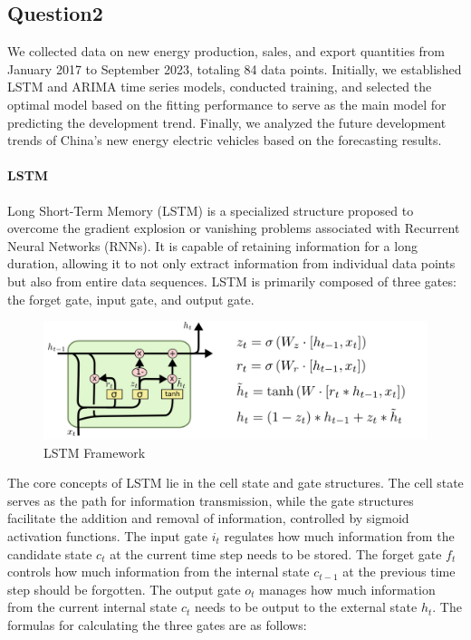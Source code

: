 \documentclass{apmcmthesis}
\begin{document}
\subsection{Question2}
We collected data on new energy production, sales, and export quantities from January 2017 to September 2023, totaling 84 data points. Initially, we established LSTM and ARIMA time series models, conducted training, and selected the optimal model based on the fitting performance to serve as the main model for predicting the development trend. Finally, we analyzed the future development trends of China's new energy electric vehicles based on the forecasting results.

\paragraph{LSTM}
Long Short-Term Memory (LSTM) is a specialized structure proposed to overcome the gradient explosion or vanishing problems associated with Recurrent Neural Networks (RNNs). It is capable of retaining information for a long duration, allowing it to not only extract information from individual data points but also from entire data sequences. LSTM is primarily composed of three gates: the forget gate, input gate, and output gate.\cite{LSTM}

\begin{figure}[h]
    \centering
    \includegraphics[scale=0.6]{figures/Figure/LSTM Framework.png}
    \caption{LSTM Framework}
\end{figure}

The core concepts of LSTM lie in the cell state and gate structures. The cell state serves as the path for information transmission, while the gate structures facilitate the addition and removal of information\cite{LSTM}, controlled by sigmoid activation functions. The input gate \( i_t \) regulates how much information from the candidate state \( c_t \) at the current time step needs to be stored. The forget gate \( f_t \) controls how much information from the internal state \( c_{t-1} \) at the previous time step should be forgotten. The output gate \( o_t \) manages how much information from the current internal state \( c_t \) needs to be output to the external state \( h_t \). The formulas for calculating the three gates are as follows:
\end{document}
